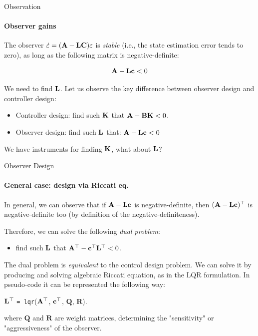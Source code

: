 \documentclass{beamer}
\begin{document}
\begin{frame}{Observation}
\framesubtitle{Observer gains}
\begin{flushleft}

The observer $\dot {\varepsilon}= 
(\mathbf{A} - \mathbf{L} \mathbf{C}) \varepsilon$ is \emph{stable} (i.e., the state estimation error tends to zero), as long as the following matrix is negative-definite:

\[
\mathbf{A} - 
\mathbf{L} \mathbf{c} < 0
\]

We need to find $\mathbf{L}$. Let us observe the key difference between observer design and controller design:

\bigskip

\begin{itemize}
    \item Controller design: find such $\mathbf{K}$ that $\mathbf{A} - \mathbf{B} \mathbf{K} < 0$.
    \item Observer design: find such $\mathbf{L}$ that: $\mathbf{A} - \mathbf{L} \mathbf{c} < 0$
\end{itemize}

\bigskip

We have instruments for finding $\mathbf{K}$, what about $\mathbf{L}$?

\end{flushleft}
\end{frame}


\begin{frame}{Observer Design}
\framesubtitle{General case: design via Riccati eq.}
\begin{flushleft}

In general, we can observe that if $\mathbf{A} - \mathbf{L} \mathbf{c}$ is negative-definite, then $(\mathbf{A} - 
\mathbf{L} \mathbf{c})^{\top}$ is negative-definite too (by definition of the negative-definiteness). 

\bigskip

Therefore, we can solve the following \emph{dual problem}:

\begin{itemize}
    \item find such $\mathbf{L}$ that $\mathbf{A}^{\top} - 
\mathbf{c}^{\top} \mathbf{L}^{\top} < 0$.
\end{itemize}

\bigskip

The dual problem is \emph{equivalent} to the control design problem. We can solve it by producing and solving algebraic Riccati equation, as in the LQR formulation. In pseudo-code it can be represented the following way:

\bigskip

$\mathbf{L}^{\top}$ \texttt{= lqr}($\mathbf{A}^{\top}$, $\mathbf{c}^{\top}$, $\mathbf Q$, $\mathbf R$).

where $\mathbf Q$ and $\mathbf R$ are weight  matrices, determining the "sensitivity" or "aggressiveness" of the observer.


\end{flushleft}
\end{frame}
\end{document}
